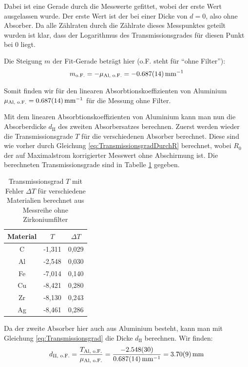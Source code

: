 \documentclass{article}
\begin{document}
Dabei ist eine Gerade durch die Messwerte gefittet, wobei der erste Wert ausgelassen wurde.
Der erste Wert ist der bei einer Dicke von $d = 0$, also ohne Absorber.
Da alle Zählraten durch die Zählrate dieses Messpunktes geteilt wurden ist klar, dass der Logarithmus des Transmissionsgrades für diesen Punkt bei 0 liegt.

Die Steigung $m$ der Fit-Gerade beträgt hier (o.F. steht für ``ohne Filter''):
\begin{displaymath}
    m_\text{o.F.} = - \mu_\text{Al, o.F.} = \SI{- 0,687 \pm 0,014}{\per \milli\meter}
\end{displaymath}

Somit finden wir für den linearen Absorbtionskoeffizienten von Aluminium $\mu_\text{Al, o.F.} = \SI{0,687 \pm 0,014}{\per \milli\meter}$ für die Messung ohne Filter.

Mit dem linearen Absorbtionskoeffizienten von Aluminium kann man nun die Absorberdicke $d_\text{II}$ des zweiten Absorbersatzes berechnen.
Zuerst werden wieder die Transmissionsgrade $T$ für die verschiedenen Absorber berechnet.
Diese sind wie vorher durch Gleichung \ref{eq:TransmissionsgradDurchR} berechnet, wobei $R_0$ der auf Maximalstrom korrigierter Messwert ohne Abschirmung ist.
Die berechneten Transmissionsgrade sind in Tabelle \ref{tab:Transmissionsgrade1} gegeben.
\begin{table}[H]
    \centering
    \caption{Transmissionsgrad $T$ mit Fehler $\Delta T$ für verschiedene Materialien berechnet aus Messreihe ohne Zirkoniumfilter}
    \begin{tabular}{|c|c|c|}
        \hline
        Material & $T$ & $\Delta T$ \\ \hline \hline
         C & -1,311 & 0,029 \\ \hline
         Al & -2,548 & 0,030 \\ \hline
         Fe & -7,014 & 0,140 \\ \hline
         Cu & -8,421 & 0,280 \\ \hline
         Zr & -8,130 & 0,243 \\ \hline
         Ag & -8,461 & 0,286 \\ \hline
    \end{tabular}
    \label{tab:Transmissionsgrade1}
\end{table}
Da der zweite Absorber hier auch aus Aluminium besteht, kann man mit Gleichung \ref{eq:Transmissionsgrad} die Dicke $d_\text{II}$ berechnen.
Wir finden:
\begin{displaymath}
    d_\text{II, o.F.} = \frac{T_\text{Al, o.F.}}{\mu_\text{Al, o.F.}} = \frac{\SI{-2,548 \pm 0,030}{}}{\SI{0,687 \pm 0,014}{\per \milli\meter}} = \SI{3,70 \pm 0,09}{\milli\meter}
\end{displaymath}
\end{document}
